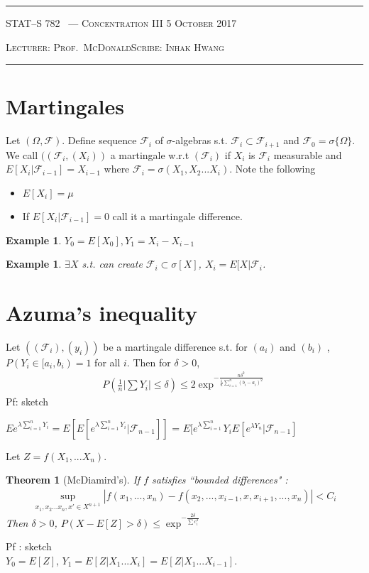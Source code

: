 \documentclass[10pt]{article}
\newcounter{lecnum}
\newtheorem{theorem}{Theorem}[lecnum]
\newtheorem{example}[ex]{Example}
\newcommand{\lecturer}{Prof.\ McDonald}
\newcommand{\scribe}{Inhak Hwang}
\newcommand{\chtitle}{Concentration III}
\newcommand{\lecdate}{5 October 2017}
\begin{document}
\rule{6.5in}{1pt}

\textsc{STAT--S 782
        \hfill \thelecnum\ --- \chtitle
        \hfill \lecdate}

\textsc{Lecturer: \lecturer \hfill Scribe: \scribe}
\rule{6.5in}{1pt}

\section{Martingales}
Let $(\Omega, \mathscr{F})$. Define sequence $\mathscr{F}_{i}$ of $\sigma$-algebras s.t. $\mathscr{F}_{i} \subset \mathscr{F}_{i+1}$ and $\mathscr{F}_{0} = \sigma\{ \Omega\}$. We call $((\mathscr{F}_{i}, (X_{i}))$ a martingale w.r.t $(\mathscr{F}_{i})$ if $X_{i}$ is $\mathscr{F}_{i}$ measurable and $E[X_{i} | \mathscr{F}_{i-1}] = X_{i-1}$ where $\mathscr{F}_{i} = \sigma(X_{1},X_{2}...X_{i})$. Note the following 
\begin{itemize}
\item $ E[X_{i}] = \mu $
\item If $E[X_{i}|\mathscr{F}_{i-1}] = 0$ call it a martingale difference.
\end{itemize}

\begin{example}
$Y_{0} = E[X_{0}], Y_{1} = X_{i} - X_{i-1}$
\end{example}
\begin{example}
$\exists X$ s.t. can create $\mathscr{F}_{i} \subset \sigma[X]$, $X_{i} = E[X | \mathscr{F}_{i}$.
\end{example}

\section{Azuma's inequality}
Let $((\mathscr{F}_{i}), (y_{i}))$ be a martingale difference s.t. for $(a_{i})$ and $(b_{i})$ , $P(Y_{i} \in [a_{i}, b_{i}) = 1 $ for all $i$. Then for $\delta > 0$, 
\begin{align*}
P(\frac{1}{n}|\sum Y_{i}| \le \delta) \le 2\exp^{-\frac{n\delta^{2}}{\frac{1}{n}\sum\limits_{i=1}^{n}(b_{i}-a_{i})^{2}  }}
\end{align*}
Pf: sketch \par
$Ee^{\lambda \sum\limits_{i=1}^{n}Y_{i}} = E[E[e^{\lambda\sum\limits_{i=1}^{n}Y_{i}}|\mathscr{F}_{n-1}]] $
= $ E[e^{\lambda \sum\limits_{i=1}^{n}} Y_{i}E[e^{ \lambda Y_{n} } | \mathscr{F}_{n-1}] $ \\
\par
Let $Z = f(X_{1},...X_{n})$.
\begin{theorem}[McDiamird's]
If $f$ satisfies ``bounded differences" : \\
\begin{align*}
\sup\limits_{x_{1},x_{2}...x_{n},x'\in X^{n+1}}|f(x_{1},...,x_{n}) - f(x_{2},..., x_{i-1},x, x_{i+1},...,x_{n})| < C_{i}
\end{align*}
Then $\delta > 0$, $P(X - E[Z] > \delta) \le \exp^{-\frac{2\delta}{\sum c_{i}^{2}}}$
\end{theorem}
Pf : sketch \\
$Y_{0} = E[Z]$, $Y_{1} = E[Z|X_{1}...X_{i}] = E[Z|X_{1}...X_{i-1}]$.


\end{document}
